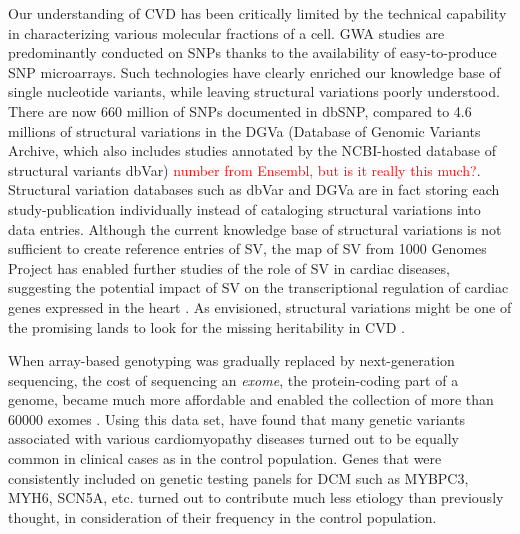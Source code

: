 \documentclass[letter]{bioinfo}
\newcommand{\comment}[1]{\textcolor{red}{#1}}
\begin{document}
Our understanding of CVD has been critically limited by the technical capability in characterizing various molecular fractions of a cell. GWA studies are predominantly conducted on SNPs thanks to the availability of easy-to-produce SNP microarrays. Such technologies have clearly enriched our knowledge base of single nucleotide variants, while leaving structural variations poorly understood. There are now 660 million of SNPs documented in dbSNP, compared to 4.6 millions of structural variations in the DGVa (Database of Genomic Variants Archive, which also includes studies annotated by the NCBI-hosted database of structural variants dbVar) \comment{number from Ensembl, but is it really this much?}. Structural variation databases such as dbVar and DGVa are in fact storing each study-publication individually instead of cataloging structural variations into data entries. Although the current knowledge base of structural variations is not sufficient to create reference entries of SV, the map of SV from 1000 Genomes Project \citep{Sudmant:2015:integrated} has enabled further studies of the role of SV in cardiac diseases, suggesting the potential impact of SV on the transcriptional regulation of cardiac genes expressed in the heart \citep{Haas:2018:Genomic}. As envisioned, structural variations might be one of the promising lands to look for the missing heritability in CVD \citep{Eichler:2010:Missing}.

When array-based genotyping was gradually replaced by next-generation sequencing, the cost of sequencing an \textit{exome}, the protein-coding part of a genome, became much more affordable and enabled the collection of more than 60000 exomes \citep{Lek:2016:Analysis}. Using this data set, \cite{Walsh:2017:Reassessment} have found that many genetic variants associated with various cardiomyopathy diseases turned out to be equally common in clinical cases as in the control population. Genes that were consistently included on genetic testing panels for DCM such as MYBPC3, MYH6, SCN5A, etc. turned out to contribute much less etiology than previously thought, in consideration of their frequency in the control population.
\end{document}
